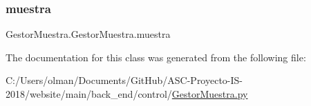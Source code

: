 \subsubsection{\texorpdfstring{muestra}{muestra}}
{\footnotesize\ttfamily Gestor\+Muestra.\+Gestor\+Muestra.\+muestra}



The documentation for this class was generated from the following file\+:\begin{DoxyCompactItemize}
\item 
C\+:/\+Users/olman/\+Documents/\+Git\+Hub/\+A\+S\+C-\/\+Proyecto-\/\+I\+S-\/2018/website/main/back\+\_\+end/control/\mbox{\hyperlink{_gestor_muestra_8py}{Gestor\+Muestra.\+py}}\end{DoxyCompactItemize}
